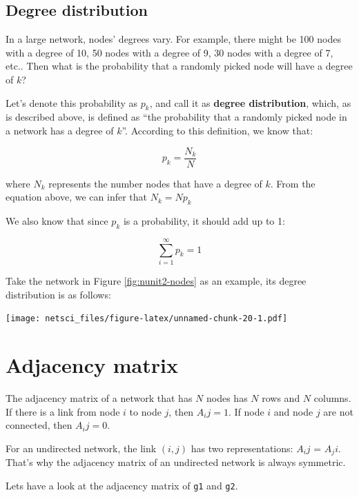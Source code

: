 \documentclass[
]{krantz}
\begin{document}
\hypertarget{degree-distribution}{%
\subsection{Degree distribution}\label{degree-distribution}}

In a large network, nodes' degrees vary. For example, there might be 100 nodes with a degree of 10, 50 nodes with a degree of 9, 30 nodes with a degree of 7, etc.. Then what is the probability that a randomly picked node will have a degree of \(k\)?

Let's denote this probability as \(p_k\), and call it as \textbf{degree distribution}, which, as is described above, is defined as ``the probability that a randomly picked node in a network has a degree of \(k\)''. According to this definition, we know that:

\begin{equation}
  p_k = \frac{N_k}{N} \label{eq:degree-distribution}
\end{equation}

where \(N_k\) represents the number nodes that have a degree of \(k\). From the equation above, we can infer that \(N_k = Np_k\)

We also know that since \(p_k\) is a probability, it should add up to 1:

\begin{equation}
  \sum_{i=1}^\infty p_k = 1 \label{eq:pk-sum}
\end{equation}

Take the network in Figure \ref{fig:nunit2-nodes} as an example, its degree distribution is as follows:

\texttt{[image: netsci\_files/figure-latex/unnamed-chunk-20-1.pdf]}

\hypertarget{adjacency-matrix}{%
\section{Adjacency matrix}\label{adjacency-matrix}}

The adjacency matrix of a network that has \(N\) nodes has \(N\) rows and \(N\) columns. If there is a link from node \(i\) to node \(j\), then \(A_ij = 1\). If node \(i\) and node \(j\) are not connected, then \(A_ij = 0\).

For an undirected network, the link \((i, j)\) has two representations: \(A_ij\) = \(A_ji\). That's why the adjacency matrix of an undirected network is always symmetric.

Lets have a look at the adjacency matrix of \texttt{g1} and \texttt{g2}.
\end{document}
